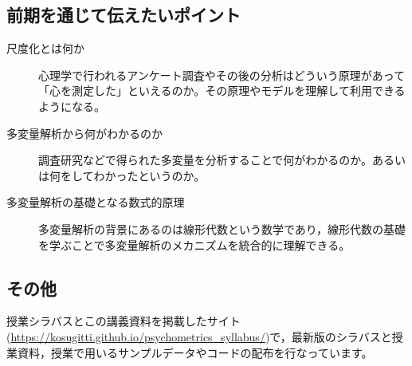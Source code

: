 \subsection*{前期を通じて伝えたいポイント}
\begin{description}
	\item[尺度化とは何か] 心理学で行われるアンケート調査やその後の分析はどういう原理があって「心を測定した」といえるのか。その原理やモデルを理解して利用できるようになる。
	\item[多変量解析から何がわかるのか] 調査研究などで得られた多変量を分析することで何がわかるのか。あるいは何をしてわかったというのか。
	\item[多変量解析の基礎となる数式的原理] 多変量解析の背景にあるのは線形代数という数学であり，線形代数の基礎を学ぶことで多変量解析のメカニズムを統合的に理解できる。
\end{description}

\subsection*{その他}
授業シラバスとこの講義資料を掲載したサイト(\url{https://kosugitti.github.io/psychometrics_syllabus/})で，最新版のシラバスと授業資料，授業で用いるサンプルデータやコードの配布を行なっています。
